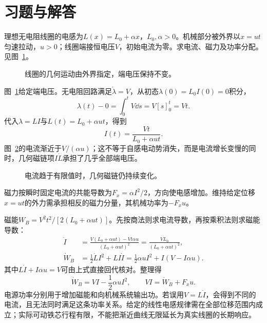 \section{习题与解答}

\begin{exercise}[恒电压与变化电感]\label{ex:i2-h1}
理想无电阻线圈的电感为$L(x)=L_0+\alpha x$，$L_0,\alpha>0$。机械部分被外界以$x=ut$匀速拉动，$u>0$；线圈端接恒电压$V$，初始电流为零。求电流、磁力及功率分配。 见图~\ref{fig:i2-h1-q}。
\end{exercise}

\begin{figure}[H]\centering
{}
\caption{线圈的几何运动由外界指定，端电压保持不变。}\label{fig:i2-h1-q}
\end{figure}
\begin{solution}
图~\ref{fig:i2-h1-q}给定端电压。无电阻回路满足$\dot\lambda=V$，从初态$\lambda(0)=L_0I(0)=0$积分，
\[\lambda(t)-0=\int_0^tV\dd s=V[s]_0^t=Vt.\]
代入$\lambda=LI$与$L(t)=L_0+\alpha ut$，得到
\[\boxed{I(t)=\frac{Vt}{L_0+\alpha ut}}.
\]
图~\ref{fig:i2-h1-s}的电流渐近于$V/(\alpha u)$；这不等于自感电动势消失，而是电流增长变慢的同时，几何磁链项$I\dot L$承担了几乎全部端电压。


\begin{figure}[H]\centering
{}
\caption{电流趋于有限值时，几何磁链仍持续变化。}\label{fig:i2-h1-s}
\end{figure}

磁力按瞬时固定电流的共能导数为$F_x=\alpha I^2/2$，方向使电感增加。维持给定位移$x=ut$的外力需承担相反的磁力分量，其机械功率为$-F_xu$。

磁能$W_B=V^2t^2/[2(L_0+\alpha ut)]$。先按商法则求电流导数，再按乘积法则求磁能导数：
\[\begin{aligned}
\dot I&=\frac{V(L_0+\alpha ut)-Vt\alpha u}{(L_0+\alpha ut)^2}
=\frac{VL_0}{(L_0+\alpha ut)^2},\\
\dot W_B&=\frac12\dot L I^2+LI\dot I
=\frac12\alpha uI^2+I(V-I\alpha u).
\end{aligned}\]
其中$L\dot I+I\alpha u=V$可由上式直接回代核对。整理得
\[\dot W_B=VI-\frac12\alpha uI^2,\qquad
VI=\dot W_B+F_xu.
\]
电源功率分别用于增加磁能和向机械系统输出功。若误用$V=L\dot I$，会得到不同的电流，且无法同时满足这条功率关系。给定的线性电感规律需在全部位移范围内成立；实际可动铁芯行程有限，不能把渐近曲线无限延长为真实线圈的长期响应。
\end{solution}

